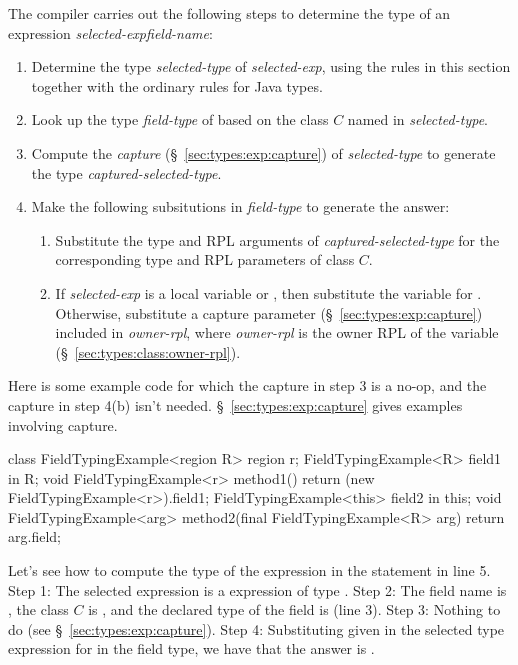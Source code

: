 The compiler carries out the following steps to determine the type of
an expression \emph{selected-exp}\emph{field-name}:
%
\begin{enumerate}
%
\item Determine the type \emph{selected-type} of \emph{selected-exp}, using the rules in
  this section together with the ordinary rules for Java types.
%
\item Look up the type \emph{field-type} of  based on the
  class $C$ named in \emph{selected-type}.
%
\item Compute the \emph{capture} (\S~\ref{sec:types:exp:capture}) of
  \emph{selected-type} to generate the type
  \emph{captured-selected-type}.
%
\item Make the following subsitutions in \emph{field-type} to generate
  the answer:
%
\begin{enumerate}
%
\item Substitute the type and RPL arguments of
  \emph{captured-selected-type} for the corresponding type and RPL
  parameters of class $C$.
%
\item If \emph{selected-exp} is a  local variable or
  , then substitute the variable for .  Otherwise,
  substitute a capture parameter (\S~\ref{sec:types:exp:capture})
  included in \emph{owner-rpl}\kwd{:*}, where \emph{owner-rpl} is the
  owner RPL of the variable (\S~\ref{sec:types:class:owner-rpl}).
%
\end{enumerate}
%
\end{enumerate}

Here is some example code for which the capture in step 3 is a no-op,
and the capture in step 4(b) isn't needed.
\S~\ref{sec:types:exp:capture} gives examples involving capture.
%
\begin{numbereddpjlisting}
class FieldTypingExample<region R> {
    region r;
    FieldTypingExample<R> field1 in R;
    void FieldTypingExample<r> method1() {
        return (new FieldTypingExample<r>).field1;
    }        
    FieldTypingExample<this> field2 in this;
    void FieldTypingExample<arg> 
      method2(final FieldTypingExample<R> arg) {
        return arg.field;
    }
}
\end{numbereddpjlisting}
%

Let's see how to compute the type of the expression in the
 statement in line 5.  Step 1: The selected expression is
a  expression of type .  Step 2:
The field name is , the class $C$ is
, and the declared type of the field is
 (line 3).  Step 3: Nothing to do (see
\S~\ref{sec:types:exp:capture}).  Step 4: Substituting  given
in the selected type expression for  in the field type, we have
that the answer is .

